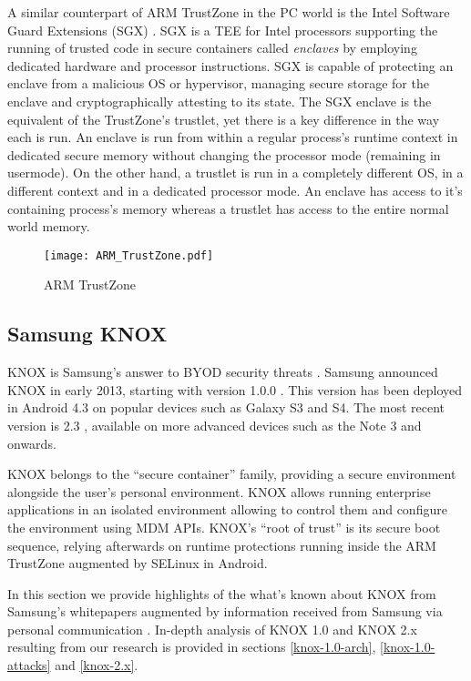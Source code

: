 \documentclass[11pt]{article}
\begin{document}
A similar counterpart of ARM TrustZone in the PC world is the Intel Software Guard Extensions (SGX) \cite{IntelSGXExplained}. 
SGX is a TEE for Intel processors supporting the running of trusted code in secure containers called \emph{enclaves} by 
employing dedicated hardware and processor instructions.
SGX is capable of protecting an enclave from a malicious OS or hypervisor, managing secure storage for the enclave and cryptographically attesting to its state. 
The SGX enclave is the equivalent of the TrustZone's trustlet, yet there is a key difference in the way each is run.
An enclave is run from within a regular process's runtime context in dedicated secure memory without changing the processor mode (remaining in usermode). 
On the other hand, a trustlet is run in a completely different OS, in a different context and in a dedicated processor mode.
An enclave has access to it's containing process's memory whereas a trustlet has access to the entire normal world memory.

\begin{figure*}[!h]
  \centering
    \caption{ARM TrustZone}
    \texttt{[image: ARM\_TrustZone.pdf]}
    \label{fig:arm-trustzone}
\end{figure*}


\subsection{Samsung KNOX}
KNOX is Samsung's answer to BYOD security threats \cite{MobileMalwareAndEnterpriseSecurity}. 
Samsung announced KNOX \cite{SamsungKNOXAnnouncement} in early 2013, starting with version 1.0.0 \cite{AnOverviewOfSamsungKNOX1}. 
This version has been deployed in Android 4.3 on popular devices such as Galaxy S3 and S4. 
The most recent version is 2.3 \cite{SamsungKNOX2Announcement}, available on more advanced devices such as the Note 3 and onwards.

KNOX belongs to the ``secure container'' family, providing a secure environment alongside the user's personal environment. 
KNOX allows running enterprise applications in an isolated environment allowing to control them and configure the environment using MDM APIs.
KNOX's ``root of trust'' is its secure boot sequence, relying afterwards on runtime protections running inside the ARM TrustZone augmented by SELinux in Android.

In this section we provide highlights of the what's known about KNOX from Samsung's whitepapers \cite{SamsungKNOXSecuritySolution} 
augmented by information received from Samsung via personal communication \cite{SamsungCorrespondence}. 
In-depth analysis of KNOX 1.0 and KNOX 2.x resulting from our research is provided in sections \ref{knox-1.0-arch}, \ref{knox-1.0-attacks} and \ref{knox-2.x}.
\end{document}
